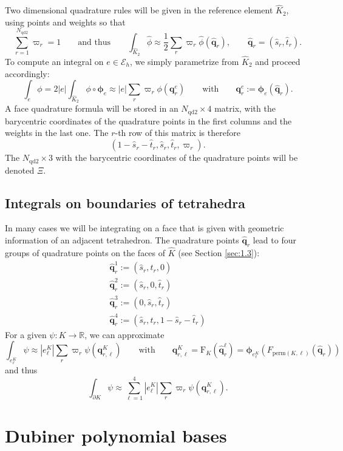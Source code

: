 \documentclass[10pt,english]{article}
\newcommand{\smallfrac}[2]{{\textstyle\frac{#1}{#2}}}
\newcommand{\Nndb}{{N_{\mathrm{qd2}}}}
\newcommand{\qq}{\widehat{\mathbf q}}
\begin{document}
Two dimensional quadrature rules will be given in the reference element $\widehat K_2$, using points and weights so that
\[
\sum_{r=1}^\Nndb\varpi_r=1\qquad\mbox{and thus}\qquad
\int_{\widehat K_2} \widehat\phi \approx \smallfrac12 \sum_r \varpi_r \widehat\phi(\qq_r), \qquad \qq_r=(\widehat s_r,\widehat t_r).
\]
To compute an integral on $e\in \mathcal E_h$, we simply parametrize from $\widehat K_2$ and proceed accordingly:
\[
\int_e \phi = 2 |e| \int_{\widehat K_2} \phi\circ\boldsymbol\phi_e\approx|e|\sum_r \varpi_r \phi(\mathbf q_r^e) \qquad\mbox{with}\qquad \mathbf q_r^e:=\boldsymbol\phi_e(\qq_r).
\]
A face quadrature formula will be stored in an $\Nndb\times 4$ matrix, with the barycentric coordinates of the quadrature points in the first columns and the weights in the last one. The $r$-th row of this matrix is therefore
\[
(1-\widehat s_r-\widehat t_r,\widehat s_r,\widehat t_r,\varpi_r).
\]
The $\Nndb\times 3$ with the barycentric coordinates of the quadrature points will be denoted $\Xi$.

\subsection{Integrals on boundaries of tetrahedra}\label{sec:2.3}

In many cases we will be integrating on a face that is given with geometric information of an adjacent tetrahedron. The quadrature points $\qq_r$ lead to four groups of quadrature points on the faces of $\widehat K$ (see Section \ref{sec:1.3}):
\[
\begin{array}{l}
\qq_r^1 :=(\widehat s_r,\widehat t_r,0)\\[1.5ex]
\qq_r^2 :=(\widehat s_r,0,\widehat t_r)\\[1.5ex]
\qq_r^3 :=(0,\widehat s_r,\widehat t_r)\\[1.5ex]
\qq_r^4 :=(\widehat s_r,\widehat t_r,1-\widehat s_r-\widehat t_r)
\end{array}
\]
For a given $\psi:K\to \mathbb R$, we can approximate
\[
\int_{e_\ell^K}\psi \approx |e_\ell^K| \sum_r \varpi_r\psi (\mathbf q_{r,\ell}^K) \qquad\mbox{with}\qquad \mathbf q_{r,\ell}^K =\mathrm F_K(\qq_r^\ell)=\boldsymbol\phi_{e_\ell^K}(F_{\mathrm{perm}(K,\ell)}(\widehat{\mathbf q}_r))
\]
and thus
\[
\int_{\partial K}\psi \approx \sum_{\ell=1}^ 4 |e_\ell^K|\sum_r \varpi_r\psi (\mathbf q_{r,\ell}^K) .
\]

\section{Dubiner polynomial bases}
\end{document}
